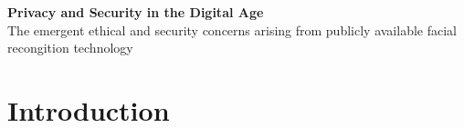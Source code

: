 \documentclass{article}
\begin{document}
\pagestyle{fancy}
\fancyhf{} %
\fancyfoot[R]{\fontsize{8}{12}\selectfont \thepage \hspace{0.02cm}}


\begin{center}
  \Large\textbf{Privacy and Security in the Digital Age}\\
  \small{The emergent ethical and security concerns arising from publicly available facial recongition technology}
\end{center}
\section*{\fontsize{10}{12}\selectfont Introduction}
\end{document}
